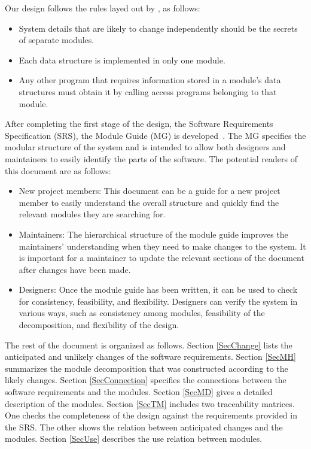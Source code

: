 \documentclass[12pt, titlepage]{article}
\begin{document}
Our design follows the rules layed out by \citet{ParnasEtAl1984}, as follows:
\begin{itemize}
\item System details that are likely to change independently should be the
  secrets of separate modules.
\item Each data structure is implemented in only one module.
\item Any other program that requires information stored in a module's data
  structures must obtain it by calling access programs belonging to that module.
\end{itemize}

After completing the first stage of the design, the Software Requirements
Specification (SRS), the Module Guide (MG) is developed~\citep{ParnasEtAl1984}. The MG specifies the modular structure of the system and is intended to allow both designers and maintainers to easily identify the parts of the software. The potential readers of this document are as follows:

\begin{itemize}
\item New project members: This document can be a guide for a new project member to easily understand the overall structure and quickly find the
  relevant modules they are searching for.
\item Maintainers: The hierarchical structure of the module guide improves the maintainers' understanding when they need to make changes to the system. It is important for a maintainer to update the relevant sections of the document after changes have been made.
\item Designers: Once the module guide has been written, it can be used to check for consistency, feasibility, and flexibility. Designers can verify the system in various ways, such as consistency among modules, feasibility of the decomposition, and flexibility of the design.
\end{itemize}

The rest of the document is organized as follows. Section \ref{SecChange} lists the anticipated and unlikely changes of the software requirements. Section \ref{SecMH} summarizes the module decomposition that was constructed according to the likely changes. Section \ref{SecConnection}
specifies the connections between the software requirements and the
modules. Section \ref{SecMD} gives a detailed description of the
modules. Section \ref{SecTM} includes two traceability matrices. One checks
the completeness of the design against the requirements provided in the SRS. The other shows the relation between anticipated changes and the modules. Section \ref{SecUse} describes the use relation between modules.
\end{document}
